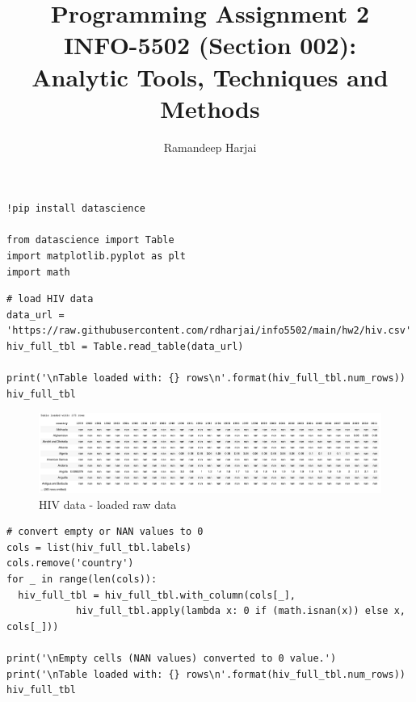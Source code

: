 \documentclass[UTF8, letter]{article}
\title{Programming Assignment 2 \\
\large INFO-5502 (Section 002): \\
Analytic Tools, Techniques and Methods }
\author{Ramandeep Harjai}
\begin{document}
\maketitle

\doublespacing
\setlength{\parskip}{\baselineskip}
\setlength{\parindent}{4em}

\begin{codeblock}
\begin{verbatim}
!pip install datascience

from datascience import Table
import matplotlib.pyplot as plt
import math
\end{verbatim}
\end{codeblock}

\vspace{5mm}
\begin{codeblock}
\begin{verbatim}
# load HIV data 
data_url = 'https://raw.githubusercontent.com/rdharjai/info5502/main/hw2/hiv.csv'
hiv_full_tbl = Table.read_table(data_url)

print('\nTable loaded with: {} rows\n'.format(hiv_full_tbl.num_rows))
hiv_full_tbl
\end{verbatim}
\end{codeblock}

\vspace{5mm}
\begin{figure}[h!]
	\centering
	\includegraphics[width=\linewidth]{output_1.png}
	\caption{HIV data - loaded raw data}
	\label{fig:boat1}
\end{figure}


\pagebreak
\begin{codeblock}
\begin{verbatim}
# convert empty or NAN values to 0
cols = list(hiv_full_tbl.labels)
cols.remove('country')
for _ in range(len(cols)):
  hiv_full_tbl = hiv_full_tbl.with_column(cols[_], 
            hiv_full_tbl.apply(lambda x: 0 if (math.isnan(x)) else x, cols[_]))

print('\nEmpty cells (NAN values) converted to 0 value.')
print('\nTable loaded with: {} rows\n'.format(hiv_full_tbl.num_rows))
hiv_full_tbl
\end{verbatim}
\end{codeblock}
\end{document}
